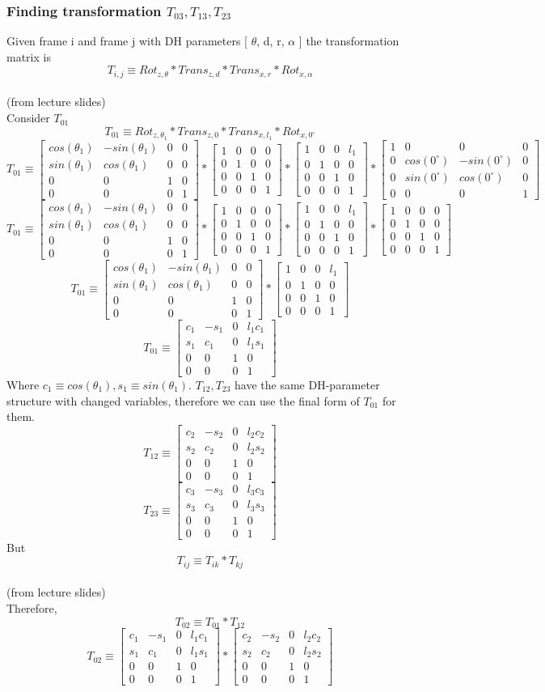 \documentclass[12pt]{article}
\newcommand{\fromlectures}{{\\ \color{blue} \hspace*{\fill}(from lecture slides)} \\}
\newcommand{\rx}[1]{\begin{bmatrix} 1 & 0 & 0 & 0 \\ 0 & cos(#1) & -sin(#1) & 0 \\ 0 & sin(#1) & cos(#1) & 0 \\ 0 & 0 & 0 & 1 \end{bmatrix}}
\newcommand{\rz}[1]{\begin{bmatrix} cos(#1) & -sin(#1) & 0 & 0 \\ sin(#1) & cos(#1) & 0 & 0 \\ 0 & 0 & 1 & 0 \\ 0 & 0 & 0 & 1 \end{bmatrix}}
\newcommand{\iden}{\begin{bmatrix} 1 & 0 & 0 & 0 \\ 0 & 1 & 0 & 0 \\ 0 & 0 & 1 & 0 \\ 0 & 0 & 0 & 1 \end{bmatrix}}
\newcommand{\trans}[3]{\begin{bmatrix} 1 & 0 & 0 & #1 \\ 0 & 1 & 0 & #2 \\ 0 & 0 & 1 & #3 \\ 0 & 0 & 0 & 1 \end{bmatrix}}
\begin{document}
\subsubsection*{Finding transformation $T_{03}, T_{13}, T_{23}$}
Given frame i and frame j with DH parameters [ $\theta$, d, r, $\alpha$ ] the transformation matrix is
\[
  T_{i,j} \equiv Rot_{z,\theta} * Trans_{z, d} * Trans_{x, r} * Rot_{x, \alpha}
\]
\fromlectures
Consider $T_{01}$
\[
  T_{01} \equiv Rot_{z,\theta_1} * Trans_{z, 0} * Trans_{x, l_1} * Rot_{x, 0^{\circ}}
\]
\[
  T_{01} \equiv \rz{\theta_1} * \trans{0}{0}{0} * \trans{l_1}{0}{0} * \rx{0^{\circ}}
\]
\[
  T_{01} \equiv \rz{\theta_1} * \iden * \trans{l_1}{0}{0} * \iden
\]
\[
  T_{01} \equiv \rz{\theta_1} * \trans{l_1}{0}{0}
\]
\[
  T_{01} \equiv
  \begin{bmatrix} c_1 & -s_1 & 0 & l_1c_1 \\ s_1 & c_1 & 0 & l_1s_1 \\ 0 & 0 & 1 & 0 \\ 0 & 0 & 0 & 1 \end{bmatrix}
\]
Where $c_1 \equiv cos(\theta_1), s_1 \equiv sin(\theta_1)$.
$T_{12}, T_{23}$ have the same DH-parameter structure with changed variables, therefore we can use the final form of $T_{01}$ for them.
\[
  T_{12} \equiv
  \begin{bmatrix} c_2 & -s_2 & 0 & l_2c_2 \\ s_2 & c_2 & 0 & l_2s_2 \\ 0 & 0 & 1 & 0 \\ 0 & 0 & 0 & 1 \end{bmatrix}
\]
\[
  T_{23} \equiv
  \begin{bmatrix} c_3 & -s_3 & 0 & l_3c_3 \\ s_3 & c_3 & 0 & l_3s_3 \\ 0 & 0 & 1 & 0 \\ 0 & 0 & 0 & 1 \end{bmatrix}
\]
But
\[
  T_{ij} \equiv T_{ik} * T_{kj}
\]
\fromlectures
Therefore,
\[
  T_{02} \equiv T_{01} * T_{12}
\]
\[
  T_{02} \equiv
  \begin{bmatrix} c_1 & -s_1 & 0 & l_1c_1 \\ s_1 & c_1 & 0 & l_1s_1 \\ 0 & 0 & 1 & 0 \\ 0 & 0 & 0 & 1 \end{bmatrix}
  *
  \begin{bmatrix} c_2 & -s_2 & 0 & l_2c_2 \\ s_2 & c_2 & 0 & l_2s_2 \\ 0 & 0 & 1 & 0 \\ 0 & 0 & 0 & 1 \end{bmatrix}
\]
\end{document}
